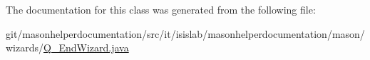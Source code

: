 The documentation for this class was generated from the following file\-:\begin{DoxyCompactItemize}
\item 
git/masonhelperdocumentation/src/it/isislab/masonhelperdocumentation/mason/wizards/\hyperlink{_q___end_wizard_8java}{Q\-\_\-\-End\-Wizard.\-java}\end{DoxyCompactItemize}
